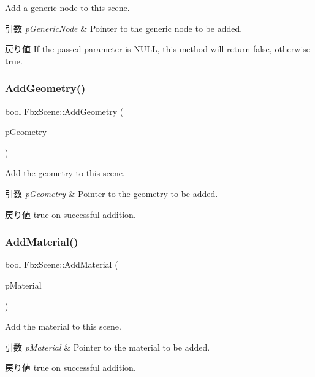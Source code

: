 Add a generic node to this scene. 
\begin{DoxyParams}{引数}
{\em p\+Generic\+Node} & Pointer to the generic node to be added. \\
\hline
\end{DoxyParams}
\begin{DoxyReturn}{戻り値}
If the passed parameter is {\ttfamily N\+U\+LL}, this method will return {\ttfamily false}, otherwise {\ttfamily true}. 
\end{DoxyReturn}
\mbox{\label{class_fbx_scene_a43871135355dec7e9eb2070b93e61423}} 
\subsubsection{\texorpdfstring{Add\+Geometry()}{AddGeometry()}}
{\footnotesize\ttfamily bool Fbx\+Scene\+::\+Add\+Geometry (\begin{DoxyParamCaption}\item[{\hyperlink{class_fbx_geometry}{Fbx\+Geometry} $\ast$}]{p\+Geometry }\end{DoxyParamCaption})}

Add the geometry to this scene. 
\begin{DoxyParams}{引数}
{\em p\+Geometry} & Pointer to the geometry to be added. \\
\hline
\end{DoxyParams}
\begin{DoxyReturn}{戻り値}
true on successful addition. 
\end{DoxyReturn}
\mbox{\label{class_fbx_scene_a65586b64256e236b0e0f2d885ca985e2}} 
\subsubsection{\texorpdfstring{Add\+Material()}{AddMaterial()}}
{\footnotesize\ttfamily bool Fbx\+Scene\+::\+Add\+Material (\begin{DoxyParamCaption}\item[{\hyperlink{class_fbx_surface_material}{Fbx\+Surface\+Material} $\ast$}]{p\+Material }\end{DoxyParamCaption})}

Add the material to this scene. 
\begin{DoxyParams}{引数}
{\em p\+Material} & Pointer to the material to be added. \\
\hline
\end{DoxyParams}
\begin{DoxyReturn}{戻り値}
true on successful addition. 
\end{DoxyReturn}
\mbox{\label{class_fbx_scene_a4da84de06d868fd3542f4688834dff6d}} 
